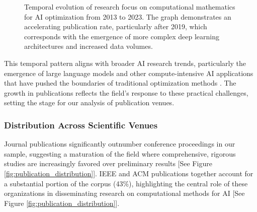 \begin{figure}[h]
\centering
{}
\caption{Temporal evolution of research focus on computational mathematics for AI optimization from 2013 to 2023. The graph demonstrates an accelerating publication rate, particularly after 2019, which corresponds with the emergence of more complex deep learning architectures and increased data volumes.}
\label{fig:temporal_evolution}
\end{figure}

This temporal pattern aligns with broader AI research trends, particularly the emergence of large language models and other compute-intensive AI applications that have pushed the boundaries of traditional optimization methods \cite{ataei2024filtering}. The growth in publications reflects the field's response to these practical challenges, setting the stage for our analysis of publication venues.

\subsubsection{Distribution Across Scientific Venues}
Journal publications significantly outnumber conference proceedings in our sample, suggesting a maturation of the field where comprehensive, rigorous studies are increasingly favored over preliminary results [See Figure \ref{fig:publication_distribution}]. IEEE and ACM publications together account for a substantial portion of the corpus (43\%), highlighting the central role of these organizations in disseminating research on computational methods for AI [See Figure \ref{fig:publication_distribution}].

